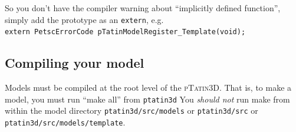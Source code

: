 \documentclass[paper=a4, fontsize=10pt,twoside]{scrartcl}
\newcommand{\ptat}{{{\textsc{pTatin3D}}}}
\newcommand{\shellcmd}[1]{\\\indent\indent\texttt{\hspace{5mm}\footnotesize #1}\\}
\newcommand{\unix}[1]{\texttt{\footnotesize #1}}
\begin{document}
{{\begin{enumerate}
So you don't have the compiler warning about ``implicitly defined function'', simply add the prototype as an \unix{extern}, e.g.
	\shellcmd{extern PetscErrorCode pTatinModelRegister\_Template(void);}
\end{enumerate}

\subsection{Compiling your model}
Models must be compiled at the root level of the {\ptat}.
That is, to make a model, you must run ``make all'' from 
	\unix{ptatin3d}
You \textit{should not} run make from within the model directory
	\unix{ptatin3d/src/models}
or
	\unix{ptatin3d/src}
or
	\unix{ptatin3d/src/models/template}.

}}
\end{document}
